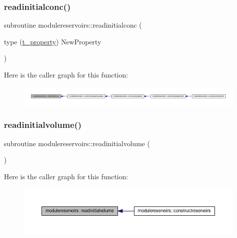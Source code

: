 \subsubsection{\texorpdfstring{readinitialconc()}{readinitialconc()}}
{\footnotesize\ttfamily subroutine modulereservoirs\+::readinitialconc (\begin{DoxyParamCaption}\item[{type (\mbox{\hyperlink{structmodulereservoirs_1_1t__property}{t\+\_\+property}})}]{New\+Property }\end{DoxyParamCaption})\hspace{0.3cm}{\ttfamily [private]}}

Here is the caller graph for this function\+:\nopagebreak
\begin{figure}[H]
\begin{center}
\leavevmode
\includegraphics[width=350pt]{namespacemodulereservoirs_a211f03dad795e61e39d0f58b7002bb26_icgraph}
\end{center}
\end{figure}
\mbox{\label{namespacemodulereservoirs_a392b0a0c6b8aeaf0e9cd41b21b155341}} 
\subsubsection{\texorpdfstring{readinitialvolume()}{readinitialvolume()}}
{\footnotesize\ttfamily subroutine modulereservoirs\+::readinitialvolume (\begin{DoxyParamCaption}{ }\end{DoxyParamCaption})\hspace{0.3cm}{\ttfamily [private]}}

Here is the caller graph for this function\+:\nopagebreak
\begin{figure}[H]
\begin{center}
\leavevmode
\includegraphics[width=350pt]{namespacemodulereservoirs_a392b0a0c6b8aeaf0e9cd41b21b155341_icgraph}
\end{center}
\end{figure}
\mbox{\label{namespacemodulereservoirs_a24436967478aa33f4288a6cec5b2bb59}} 
